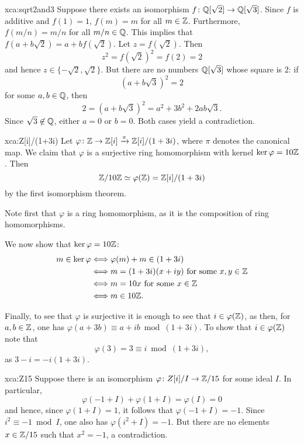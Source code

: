 \begin{sol}{xca:sqrt2and3}
Suppose there exists an isomorphism $f\colon \mathbb{Q}[\sqrt{2}]\to\mathbb{Q}[\sqrt{3}]$. 
Since $f$ is additive and $f(1)=1$, $f(m)=m$ for all $m\in\mathbb{Z}$. Furthermore,
$f(m/n)=m/n$ for all $m/n\in\mathbb{Q}$. This implies that $f(a+b\sqrt{2})=a+bf(\sqrt{2})$. 
Let $z=f(\sqrt{2})$. Then 
\[
z^2=f(\sqrt{2})^2=f(2)=2
\]
and hence $z\in\{-\sqrt{2},\sqrt{2}\}$. But there are no numbers 
$\mathbb{Q}[\sqrt{3}]$ whose square is $2$: if \[
\left(a+b\sqrt{3}\right)^2=2
\]
for some
$a,b\in\mathbb{Q}$, then 
\[
2=\left(a+b\sqrt{3}\right)^2=a^2+3b^2+2ab\sqrt{3}.
\]
Since $\sqrt{3}\not\in\mathbb{Q}$, either $a=0$ or $b=0$. Both cases yield 
a contradiction. 
\end{sol}

\begin{sol}{xca:Z[i]/(1+3i)}
    Let $\varphi\colon\mathbb{Z}\to\mathbb{Z}[i]\xrightarrow{\pi}\mathbb{Z}[i]/(1+3i)$, where $\pi$ denotes the canonical map. 
    We claim that $\varphi$ is a surjective ring homomorphism with kernel $\ker\varphi=10\mathbb{Z}$. Then
    \[
    \mathbb{Z}/10\mathbb{Z}\simeq\varphi(\mathbb{Z})=\mathbb{Z}[i]/(1+3i)
    \]
    by the first isomorphism theorem. 

    Note first that $\varphi$ is a ring homomorphism, as it is 
    the composition of ring homomorphisms. 
    
    We now show that $\ker\varphi=10\mathbb{Z}$: 
    \begin{align*} 
    m\in\ker\varphi&\Longleftrightarrow \varphi(m)+m\in (1+3i)\\
    &\Longleftrightarrow m=(1+3i)(x+iy)\text{ 
    for some $x,y\in\mathbb{Z}$}\\
    &\Longleftrightarrow m=10x\text{ for some $x\in\mathbb{Z}$}\\
    &\Longleftrightarrow m\in 10\mathbb{Z}.
    \end{align*}

    Finally, to see that $\varphi$ is surjective it is enough to 
    see that $i\in\varphi(\mathbb{Z})$, as 
    then, for $a,b\in\mathbb{Z}$, one has 
    $\varphi(a+3b)\equiv a+ib\bmod (1+3i)$. 
    To show that $i\in\varphi(\mathbb{Z})$
    note
    that \[
    \varphi(3)=3\equiv i\bmod (1+3i),
    \]
    as $3-i=-i(1+3i)$. 
\end{sol}



\begin{sol}{xca:Z15}
    Suppose there is an isomorphism $\varphi\colon Z[i]/I\to \mathbb{Z}/15$ for some 
    ideal $I$. In particular, 
    \[ 
    \varphi(-1+I)+\varphi(1+I)=\varphi(I)=0
    \]
    and hence, since $\varphi(1+I)=1$, it follows that $\varphi(-1+I)=-1$. Since 
    $i^2\equiv -1\bmod I$, one also has $\varphi(i^2+I)=-1$. But there are no
    elements $x\in\mathbb{Z}/15$ such that $x^2=-1$, a contradiction. 
\end{sol}

